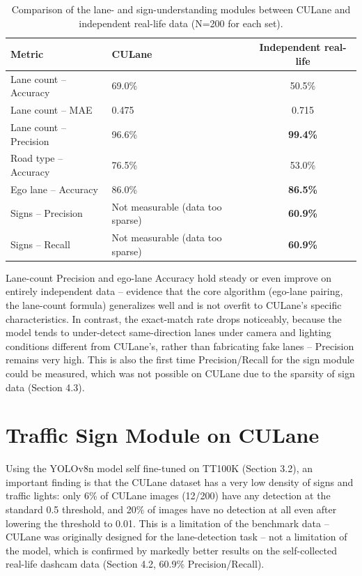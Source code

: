 \documentclass[12pt,a4paper]{report}
\begin{document}
\begin{table}[htbp]
    \centering
    \small
    \caption{Comparison of the lane- and sign-understanding modules between CULane and independent real-life data (N=200 for each set).}
    \label{tab:4.3}
    \begin{tabular}{@{}p{3.8cm}p{4.2cm}c@{}}
        \toprule
        \textbf{Metric} & \textbf{CULane} & \textbf{Independent real-life} \\
        \midrule
        Lane count -- Accuracy  & 69.0\% & 50.5\% \\
        Lane count -- MAE       & 0.475  & 0.715 \\
        Lane count -- Precision & 96.6\% & \textbf{99.4\%} \\
        Road type -- Accuracy   & 76.5\% & 53.0\% \\
        Ego lane -- Accuracy    & 86.0\% & \textbf{86.5\%} \\
        Signs -- Precision      & Not measurable (data too sparse) & \textbf{60.9\%} \\
        Signs -- Recall         & Not measurable (data too sparse) & \textbf{60.9\%} \\
        \bottomrule
    \end{tabular}
\end{table}

Lane-count Precision and ego-lane Accuracy hold steady or even improve on entirely independent data -- evidence that the core algorithm (ego-lane pairing, the lane-count formula) generalizes well and is not overfit to CULane's specific characteristics. In contrast, the exact-match rate drops noticeably, because the model tends to under-detect same-direction lanes under camera and lighting conditions different from CULane's, rather than fabricating fake lanes -- Precision remains very high. This is also the first time Precision/Recall for the sign module could be measured, which was not possible on CULane due to the sparsity of sign data (Section 4.3).

\section{Traffic Sign Module on CULane}

Using the YOLOv8n model self fine-tuned on TT100K (Section 3.2), an important finding is that the CULane dataset has a very low density of signs and traffic lights: only 6\% of CULane images (12/200) have any detection at the standard 0.5 threshold, and 20\% of images have no detection at all even after lowering the threshold to 0.01. This is a limitation of the benchmark data -- CULane was originally designed for the lane-detection task -- not a limitation of the model, which is confirmed by markedly better results on the self-collected real-life dashcam data (Section 4.2, 60.9\% Precision/Recall).
\end{document}
